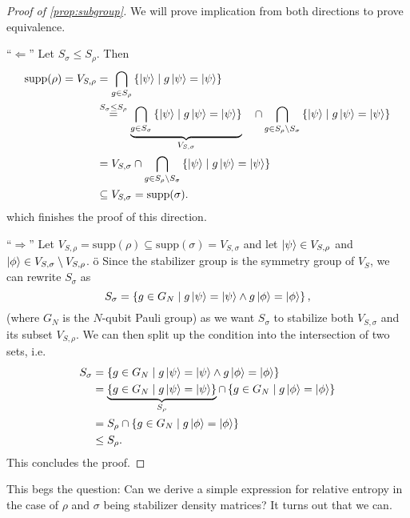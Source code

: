 \begin{proof}[Proof of \cref{prop:subgroup}]
  We will prove implication from both directions to prove equivalence.

  \enquote{$\Leftarrow$} Let $S_\sigma \leq S_\rho$. Then
  \begin{align*}
    \mathrm{supp}(\rho) = V_{S,\rho} &= \bigcap_{g\in S_\rho} \left\{ \ket{\psi} \mid
    g\ket{\psi} = \ket{\psi} \right\} \\
        &\overset{S_\sigma \leq S_\rho}{=} \underbrace{\bigcap_{g\in S_\sigma}
        \left\{\ket{\psi} \mid g \ket{\psi} =
        \ket{\psi}\right\}}_{V_{S,\sigma}}\ \ \ \cap \bigcap_{g \in S_\rho \setminus
        S_\sigma} \left\{\ket{\psi} \mid g \ket{\psi} =
        \ket{\psi}\right\}\\
        &= V_{S,\sigma} \cap \bigcap_{g \in S_\rho \setminus
        S_\sigma} \left\{\ket{\psi} \mid g \ket{\psi} =
        \ket{\psi}\right\}\\
        &\subseteq V_{S,\sigma} = \mathrm{supp}(\sigma)
  .\end{align*}
  which finishes the proof of this direction.

  \enquote{$\Rightarrow$} Let $V_{S,\rho} = \mathrm{supp}(\rho) \subseteq
  \mathrm{supp}(\sigma) = V_{S,\sigma}$ and let
  $\ket{\psi} \in V_{S,\rho}$ and $\ket{\phi} \in
  V_{S,\sigma} \setminus
  V_{S,\rho}$. \"o Since the stabilizer group is the
  symmetry group of $V_S$, we can rewrite $S_\sigma$ as
  \[ 
    S_\sigma = \left\{ g \in G_N \mid g \ket{\psi} = \ket{\psi} \wedge g\ket{\phi} =
  \ket{\phi} \right\},
  \]
  (where $G_N$ is the $N$-qubit Pauli group) 
  as we want $S_\sigma$ to stabilize both $V_{S,\sigma}$ and its subset
  $V_{S,\rho}$. We can then split up the condition into the intersection of two
  sets, i.e.
  \begin{align*}
    S_\sigma &= \left\{ g \in G_N \mid g \ket{\psi} = \ket{\psi} \wedge g\ket{\phi} =
  \ket{\phi} \right\}\\
             &= \underbrace{\left\{ g \in G_N \mid g\ket{\psi}= \ket{\psi}
             \right\}}_{S_\rho} \cap \left\{ g \in G_N \mid g\ket{\phi} = \ket{\phi} \right\} \\
             &= S_\rho \cap \left\{ g \in G_N \mid g\ket{\phi} = \ket{\phi} \right\} \\
               &\leq S_\rho 
  .\end{align*}
  This concludes the proof.
\end{proof}
This begs the question: Can we derive a simple expression for relative entropy
in the case of $\rho$ and $\sigma$ being stabilizer density matrices?
It turns out that we can.

